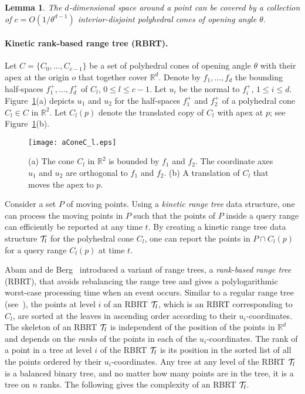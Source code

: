 \documentclass[preprint,12pt]{elsarticle}
\newtheorem{lemma}{Lemma}[section]
\begin{document}
\begin{lemma}{\tt \cite{Abam:2011:KSX:1971362.1971367}}\label{the:NumofPolyCones}
The $d$-dimensional space around a point can be covered by a collection of $c=O(1/\theta^{d-1})$ interior-disjoint polyhedral cones of opening angle $\theta$.
\end{lemma}

\paragraph{Kinetic rank-based range tree (RBRT).} Let $C=\{C_0,...,C_{c-1}\}$ be a set of polyhedral cones of opening angle $\theta$ with their apex at the origin $o$ that together cover $\mathbb{R}^d$. Denote by $f_1,...,f_d$ the bounding half-spaces $f^+_1,...,f^+_d$ of $C_l$, $0\leq l\leq c-1$. Let $u_i$ be the normal to $f^+_i$, $1\leq i\leq d$. Figure~\ref{fig:aConeC_l}(a) depicts $u_1$ and $u_2$ for the half-spaces $f^+_1$ and $f^+_2$ of a polyhedral cone $C_l\in C$ in $\mathbb{R}^2$. Let $C_l(p)$ denote the translated copy of $C_l$ with apex at $p$; see Figure~\ref{fig:aConeC_l}(b). 

\begin{figure}[t!]
\begin{center}
\texttt{[image: aConeC\_l.eps]}
\end{center}
\caption{(a) The cone $C_l$ in $\mathbb{R}^2$ is bounded by $f_1$ and $f_2$. The coordinate axes $u_1$ and $u_2$ are orthogonal to $f_1$ and $f_2$. (b) A translation of $C_l$ that moves the apex to $p$.}
\label{fig:aConeC_l}
\end{figure}

Consider a set $P$ of moving points. Using a \textit{kinetic range tree} data structure, one can process the moving points in $P$ such that the points of $P$ inside a query range can efficiently be reported at any time $t$. By creating a kinetic range tree data structure ${\cal T}_l$ for the polyhedral cone $C_l$, one can report the points in $P\cap C_l(p)$ for a query range $C_l(p)$ at time $t$. 

Abam and de Berg~\cite{Abam:2011:KSX:1971362.1971367} introduced a variant of range trees, a \textit{rank-based range tree} (RBRT), that avoids rebalancing the range tree and gives a polylogarithmic worst-case processing time when an event occurs. Similar to a regular range tree (see~\cite{Berg:2008:CGA:1370949}), the points at level $i$ of an RBRT ${\cal T}_l$, which is an RBRT corresponding to $C_l$, are sorted at the leaves in ascending order according to their $u_i$-coordinates. The skeleton of an RBRT ${\cal T}_l$ is independent of the position of the points in $\mathbb{R}^d$ and depends on the \textit{ranks} of the points in each of the $u_i$-coordinates. The rank of a point in a tree at level $i$ of the RBRT ${\cal T}_l$ is its position in the sorted list of all the points ordered by their $u_i$-coordinates. Any tree at any level of the RBRT ${\cal T}_l$ is a balanced binary tree, and no matter how many points are in the tree, it is a tree on $n$ ranks. The following gives the complexity of an RBRT ${\cal T}_l$.
\end{document}

